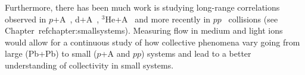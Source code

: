 Furthermore, there has been much work is studying long-range correlations
  observed in $p$+A~\cite{HION-2016-01,CMS:2012qk,Abelev:2012ola,HION-2012-13,HION-2013-04},
  d+A~\cite{Aidala:2017pup}, $^{3}\mathrm{He}$+A~\cite{Adare:2015ctn} 
  and more recently in $pp$~\cite{HION-2015-09,HION-2016-01} collisions 
  (see Chapter~ref{chapter:smallsystems}).
Measuring flow in medium and light ions would allow for a continuous study 
  of how collective phenomena vary going from large (Pb+Pb) to small 
  ($p$+A and $pp$) systems and lead to a better understanding of collectivity
  in small systems.


